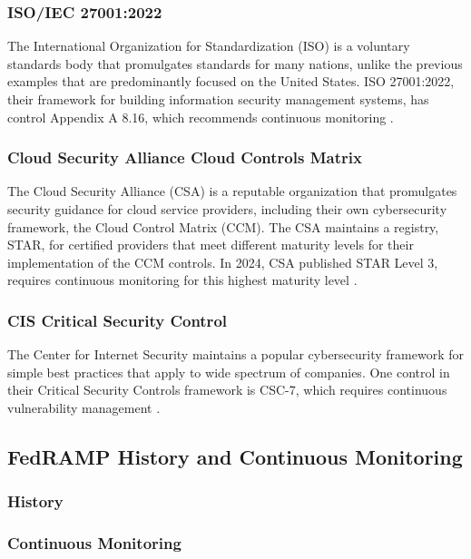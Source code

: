 \documentclass{jdf}
\begin{document}
\subsubsection{ISO/IEC 27001:2022}

The International Organization for Standardization (ISO) is a voluntary standards body that promulgates standards for many nations, unlike the previous examples that are predominantly focused on the United States. ISO 27001:2022, their framework for building information security management systems, has control Appendix A 8.16, which recommends continuous monitoring \citeyear{iso27001_22}.

\subsubsection{Cloud Security Alliance Cloud Controls Matrix}

The Cloud Security Alliance (CSA) is a reputable organization that promulgates security guidance for cloud service providers, including their own cybersecurity framework, the Cloud Control Matrix (CCM). The CSA maintains a registry, STAR, for certified providers that meet different maturity levels for their implementation of the CCM controls. In 2024, CSA published STAR Level 3, requires continuous monitoring for this highest maturity level \citeyear{csa_starl3_21}.

\subsubsection{CIS Critical Security Control}

The Center for Internet Security maintains a popular cybersecurity framework for simple best practices that apply to wide spectrum of companies. One control in their Critical Security Controls framework is CSC-7, which requires continuous vulnerability management \citeyear{csc18}.

\subsection{FedRAMP History and Continuous Monitoring}

\subsubsection{History}

\subsubsection{Continuous Monitoring}
\end{document}

